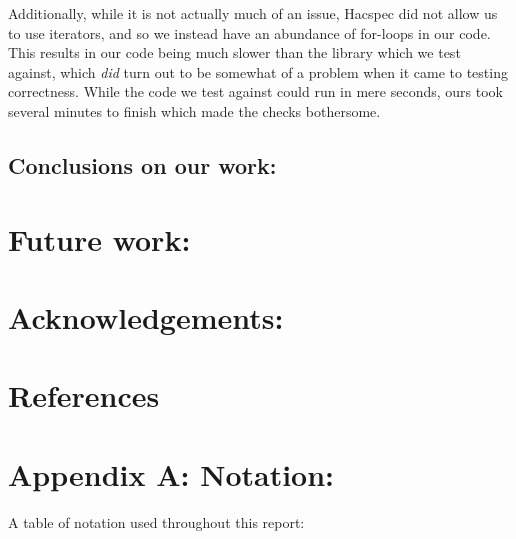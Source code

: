 \documentclass{article}
\begin{document}
Additionally, while it is not actually much of an issue, Hacspec did not allow us to use iterators, and so we instead have an abundance of for-loops in our code. This results in our code being much slower than the library which we test against, which \textit{did} turn out to be somewhat of a problem when it came to testing correctness. While the code we test against could run in mere seconds, ours took several minutes to finish which made the checks bothersome. 

\subsection{Conclusions on our work:}

\section{Future work:}

\section{Acknowledgements:}


\section{References}
\printbibliography

\section{Appendix A: Notation:} \label{notation}

A table of notation used throughout this report:
\end{document}
